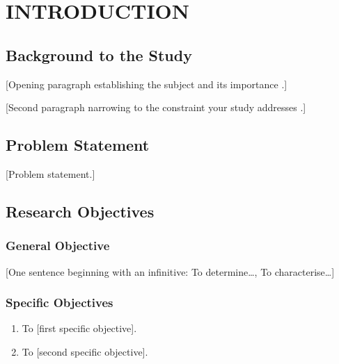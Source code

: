 \chapter{INTRODUCTION}\label{ch:1}

\section{Background to the Study}\label{sec:1.1}

{[}Opening paragraph establishing the subject and its importance \parencite{example_2020_article}.]

{[}Second paragraph narrowing to the constraint your study addresses \parencite{example_2019_book, example_2021_chapter}.]

\section{Problem Statement}\label{sec:1.2}

{[}Problem statement.]

\section{Research Objectives}\label{sec:1.3}

\subsection{General Objective}\label{sec:1.3.1}
{[}One sentence beginning with an infinitive: To determine\ldots, To characterise\ldots]

\subsection{Specific Objectives}\label{sec:1.3.2}
\begin{enumerate}
\item To [first specific objective].
\item To [second specific objective].
\end{enumerate}

